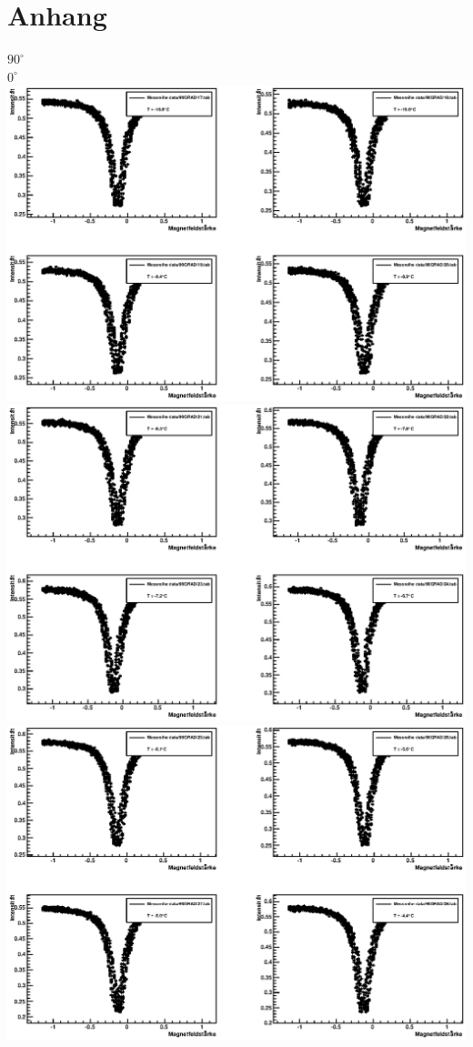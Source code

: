 \documentclass[12pt]{article}
\begin{document}
\section{Anhang}
\singlespacing
\centering
\textbf{$90^\circ$} \\

\newpage
\textbf{$0^\circ$} \\

\newpage
\includegraphics[width=1\linewidth]{pictures/1.eps} \\
\includegraphics[width=1\linewidth]{pictures/2.eps} \\
\includegraphics[width=1\linewidth]{pictures/3.eps} \\
\end{document}
